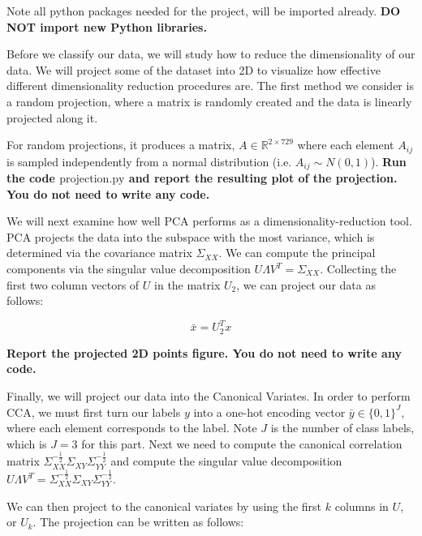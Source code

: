 \documentclass[preview]{standalone}
\begin{document}
Note all python packages needed for the project, will be imported already. {\bf DO NOT import new Python libraries.}



\begin{Parts}
\Part Before we classify our data, we will study how to reduce the
dimensionality of our data. We will project some of the dataset into 2D to visualize how effective different dimensionality reduction procedures are. The first method we consider is a random projection, where a matrix is randomly created and the data is linearly projected along it. 

For random projections, it produces a matrix, $A \in \mathbb{R}^{2 \times 729}$ where each element $A_{ij}$ is sampled independently from a normal distribution (i.e. $A_{ij} \sim N(0,1)$). {\bf Run the code $\mbox{projection.py}$ and report the resulting plot of the projection. You do not need to write any code. }







\Part We will next examine how well PCA performs as a
dimensionality-reduction tool. PCA projects the data into the subspace with the most variance, which is determined via the covariance matrix $\Sigma_{XX}$. We can compute the principal components via the singular value decomposition $U\Lambda V^T = \Sigma_{XX}$. Collecting the first two column vectors of $U$ in the matrix $U_2$, we can project our data as follows: 

$$\bar{x} = U_2^T x$$

{\bf Report the projected 2D points figure. You do not need to write any code. }



\Part Finally, we will project our data into the Canonical Variates. In order to perform CCA, we must first turn our labels $y$ into a one-hot encoding vector $\bar{y} \in \lbrace 0,1 \rbrace^{J}$, where each element corresponds to the label. Note $J$ is the number of class labels, which is $J = 3$ for this part.   Next we need to compute the canonical correlation matrix $\Sigma_{XX}^{-\frac{1}{2}}\Sigma_{XY}\Sigma_{YY}^{-\frac{1}{2}}$ and compute the singular value decomposition $U\Lambda V^T = \Sigma_{XX}^{-\frac{1}{2}}\Sigma_{XY}\Sigma_{YY}^{-\frac{1}{2}}$. 

We can then project to the canonical variates by using the first $k$ columns in $U$, or $U_k$. The projection can be written as follows: 


\end{Parts}
\end{document}
